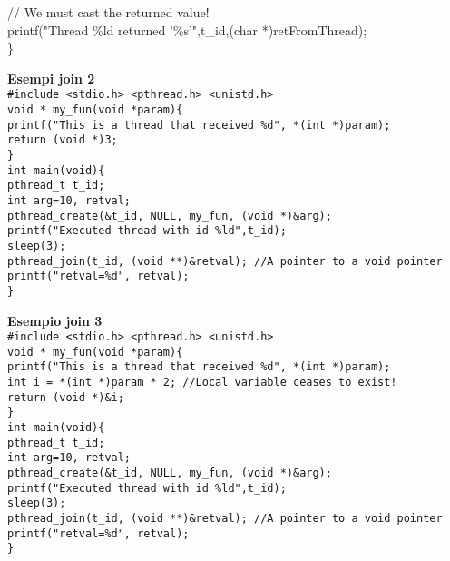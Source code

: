 \begin{flushleft}
\begin{flushleft}
{    \halftab // We must cast the returned value!\\
    \halftab printf("Thread \%ld returned '\%s'\n",t\_id,(char *)retFromThread);\\
    \} }
  \end{flushleft}
  \begin{flushleft}
    \textbf{Esempi join 2}\\
    \texttt{\#include <stdio.h> <pthread.h> <unistd.h> \\
    void * my\_fun(void *param)\{ \\
    \halftab printf("This is a thread that received \%d\n", *(int *)param);\\
    \halftab return (void *)3;\\
    \} \\
    int main(void)\{ \\
    \halftab pthread\_t t\_id;\\
    \halftab int arg=10, retval; \\
    \halftab pthread\_create(\&t\_id, NULL, my\_fun, (void *)\&arg);\\
    \halftab printf("Executed thread with id \%ld\n",t\_id);\\
    \halftab sleep(3);\\
    \halftab pthread\_join(t\_id, (void **)\&retval); //A pointer to a void pointer\\
    \halftab printf("retval=\%d\n", retval);\\
    \}}
  \end{flushleft}
  \begin{flushleft}
    \textbf{Esempio join 3}\\
    \texttt{\#include <stdio.h> <pthread.h> <unistd.h> \\
    void * my\_fun(void *param)\{\\
    \halftab printf("This is a thread that received \%d\n", *(int *)param);\\
    \halftab int i = *(int *)param * 2; //Local variable ceases to exist!\\
    \halftab return (void *)\&i;\\
    \}\\
    int main(void)\{\\
    \halftab pthread\_t t\_id;\\
    \halftab int arg=10, retval;\\ 
    \halftab pthread\_create(\&t\_id, NULL, my\_fun, (void *)\&arg);\\
    \halftab printf("Executed thread with id \%ld\n",t\_id);\\
    \halftab sleep(3);\\
    \halftab pthread\_join(t\_id, (void **)\&retval); //A pointer to a void pointer\\
    \halftab printf("retval=\%d\n", retval);\\
    \}}
  \end{flushleft}

\end{flushleft}
